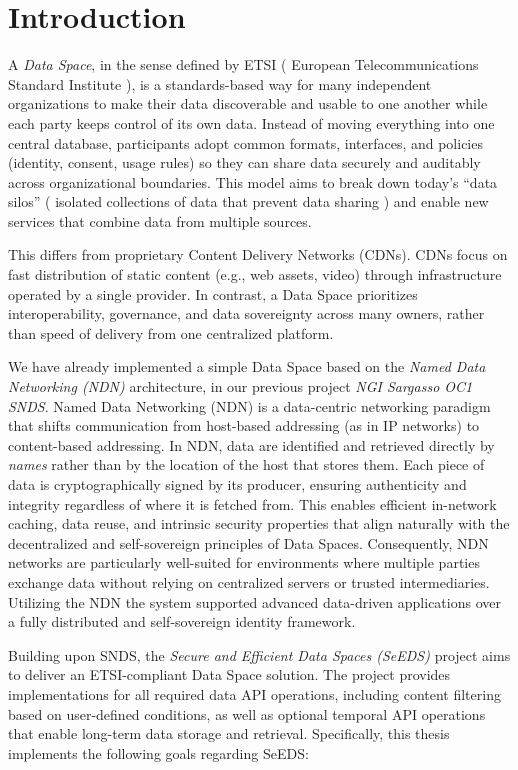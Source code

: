 \documentclass{article}
\begin{document}
\section{Introduction}

A \textit{Data Space}, in the sense defined by ETSI ( European Telecommunications Standard Institute ), is a standards-based way
for many independent organizations to make their data discoverable and usable
to one another while each party keeps control of its own data. Instead of
moving everything into one central database, participants adopt common formats,
interfaces, and policies (identity, consent, usage rules) so they can share
data securely and auditably across organizational boundaries. This model aims
to break down today’s “data silos” ( isolated collections of data that prevent data sharing ) and enable new services that combine data
from multiple sources.

This differs from proprietary Content Delivery Networks (CDNs). CDNs focus on
fast distribution of static content (e.g., web assets, video) through
infrastructure operated by a single provider. In contrast, a Data Space
prioritizes interoperability, governance, and data sovereignty across many
owners, rather than speed of delivery from one centralized platform.

We have already implemented a simple Data Space based on the \textit{Named Data Networking (NDN)} architecture, in our previous project \textit{NGI Sargasso OC1 SNDS}. Named Data Networking (NDN) is a data-centric networking paradigm that shifts communication from host-based addressing (as in IP networks) to content-based addressing. In NDN, data are identified and retrieved directly by \textit{names} rather than by the location of the host that stores them. Each piece of data is cryptographically signed by its producer, ensuring authenticity and integrity regardless of where it is fetched from. This enables efficient in-network caching, data reuse, and intrinsic security properties that align naturally with the decentralized and self-sovereign principles of Data Spaces. Consequently, NDN networks are particularly well-suited for environments where multiple parties exchange data without relying on centralized servers or trusted intermediaries. Utilizing the NDN the system supported advanced data-driven applications over a fully distributed and self-sovereign identity framework.

Building upon SNDS, the \textit{Secure and Efficient Data Spaces (SeEDS)} project aims to deliver an ETSI-compliant Data Space solution. The project provides implementations for all required data API operations, including content filtering based on user-defined conditions, as well as optional temporal API operations that enable long-term data storage and retrieval. Specifically, this thesis implements the following goals regarding SeEDS:
\end{document}

